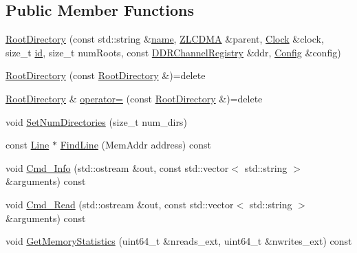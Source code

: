 \subsection*{Public Member Functions}
\begin{DoxyCompactItemize}
\item 
\hyperlink{class_simulator_1_1_z_l_c_d_m_a_1_1_root_directory_a99ccd1919c3f90cf80e199cfdd06a852}{Root\+Directory} (const std\+::string \&\hyperlink{mtconf_8c_a8f8f80d37794cde9472343e4487ba3eb}{name}, \hyperlink{class_simulator_1_1_z_l_c_d_m_a}{Z\+L\+C\+D\+M\+A} \&parent, \hyperlink{class_simulator_1_1_clock}{Clock} \&clock, size\+\_\+t \hyperlink{mtconf_8c_aa3185401f04d30bd505daebf48c39cc5}{id}, size\+\_\+t num\+Roots, const \hyperlink{class_simulator_1_1_d_d_r_channel_registry}{D\+D\+R\+Channel\+Registry} \&ddr, \hyperlink{class_config}{Config} \&config)
\item 
\hyperlink{class_simulator_1_1_z_l_c_d_m_a_1_1_root_directory_a0c26e94ad36ad90079fd07247ff3f75b}{Root\+Directory} (const \hyperlink{class_simulator_1_1_z_l_c_d_m_a_1_1_root_directory}{Root\+Directory} \&)=delete
\item 
\hyperlink{class_simulator_1_1_z_l_c_d_m_a_1_1_root_directory}{Root\+Directory} \& \hyperlink{class_simulator_1_1_z_l_c_d_m_a_1_1_root_directory_a5a4f49529867ae7cc7772f41c4b74ffb}{operator=} (const \hyperlink{class_simulator_1_1_z_l_c_d_m_a_1_1_root_directory}{Root\+Directory} \&)=delete
\item 
void \hyperlink{class_simulator_1_1_z_l_c_d_m_a_1_1_root_directory_a4f81708fe4d3763abbd1b890b4cc5ead}{Set\+Num\+Directories} (size\+\_\+t num\+\_\+dirs)
\item 
const \hyperlink{struct_simulator_1_1_z_l_c_d_m_a_1_1_root_directory_1_1_line}{Line} $\ast$ \hyperlink{class_simulator_1_1_z_l_c_d_m_a_1_1_root_directory_a86cfb532cd49f3185e4dd6ec66aec08c}{Find\+Line} (Mem\+Addr address) const 
\item 
void \hyperlink{class_simulator_1_1_z_l_c_d_m_a_1_1_root_directory_ad2515d8dbb77c9f67f95385b44f8848d}{Cmd\+\_\+\+Info} (std\+::ostream \&out, const std\+::vector$<$ std\+::string $>$ \&arguments) const 
\item 
void \hyperlink{class_simulator_1_1_z_l_c_d_m_a_1_1_root_directory_ad9f7bbafed7349d8c9c49015e057abd2}{Cmd\+\_\+\+Read} (std\+::ostream \&out, const std\+::vector$<$ std\+::string $>$ \&arguments) const 
\item 
void \hyperlink{class_simulator_1_1_z_l_c_d_m_a_1_1_root_directory_a69ecffb261f63898bebd58142ee672f8}{Get\+Memory\+Statistics} (uint64\+\_\+t \&nreads\+\_\+ext, uint64\+\_\+t \&nwrites\+\_\+ext) const 
\end{DoxyCompactItemize}
